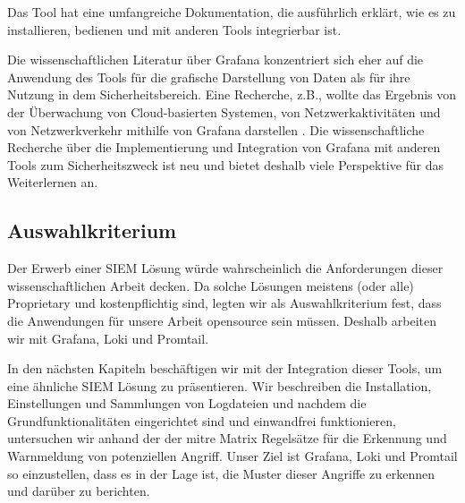 Das Tool hat eine umfangreiche Dokumentation, die ausführlich erklärt, wie es zu installieren, bedienen und mit anderen Tools integrierbar ist. 

Die wissenschaftlichen Literatur über Grafana konzentriert sich eher auf die Anwendung des Tools für die grafische Darstellung von Daten als für ihre Nutzung in dem Sicherheitsbereich. Eine Recherche, z.B., wollte das Ergebnis von der Überwachung von Cloud-basierten Systemen, von Netzwerkaktivitäten und von Netzwerkverkehr mithilfe von Grafana darstellen \citep{Manases_grafananetwork}. 
Die wissenschaftliche Recherche über die Implementierung und Integration von Grafana mit anderen Tools zum Sicherheitszweck ist neu und bietet deshalb viele  Perspektive für das Weiterlernen an.

\subsection{Auswahlkriterium}
Der Erwerb einer \gls{SIEM} Lösung würde wahrscheinlich die Anforderungen dieser wissenschaftlichen Arbeit decken. Da solche Lösungen meistens (oder alle) \gls{Proprietary} und kostenpflichtig sind, legten wir als Auswahlkriterium fest, dass die Anwendungen für unsere Arbeit \gls{opensource} sein müssen. Deshalb arbeiten wir mit Grafana, Loki und Promtail.

In den nächsten Kapiteln beschäftigen wir mit der Integration dieser Tools, um eine ähnliche \gls{SIEM} Lösung zu präsentieren. Wir beschreiben die Installation, Einstellungen und Sammlungen von Logdateien und nachdem die Grundfunktionalitäten eingerichtet sind und einwandfrei funktionieren, untersuchen wir anhand der  der \gls{mitre} Matrix Regelsätze für die Erkennung und Warnmeldung von potenziellen Angriff. Unser Ziel ist Grafana, Loki und Promtail so einzustellen, dass es in der Lage ist, die Muster dieser Angriffe zu erkennen und darüber zu berichten.
